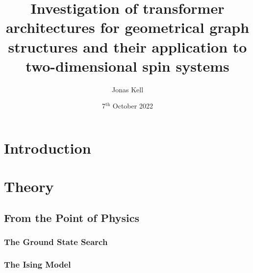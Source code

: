 \documentclass[
headings=optiontohead,              %
12pt,                               %
DIV=13,                             %
twoside=false,                      %
open=right,                         %
BCOR=10mm,                          %
toc=bibliographynumbered            %
]{scrreport}
\title{Investigation of transformer architectures for geometrical graph structures and their application to two-dimensional spin systems} %
\author{Jonas Kell}
\date{7$^\text{th}$ October 2022}
\begin{document}
\thispagestyle{empty}                           %
\cleardoublepage                                %
\pagestyle{scrheadings}                         %
\renewcommand{\contentsname}{Table of Contents} %
\tableofcontents                                %
\cleardoublepage                                %

\clearpairofpagestyles
\ihead{\leftmark}
\ohead{\Ifstr{\leftmark}{\rightmark}{}{\rightmark}}
\cfoot*{\pagemark}


\chapter{Introduction}
\label{sec:introduction}

\FloatBarrier
\chapter{Theory}
\label{sec:theory}
    \section{From the Point of Physics}
        \label{sec:theory-physics}
        
        \FloatBarrier
        \subsection{The Ground State Search}
        \label{sec:theory-groundstatesearch}
        
        \subsection{The Ising Model}
        \label{sec:theory-ising}
        
        \FloatBarrier
        \FloatBarrier
\end{document}
